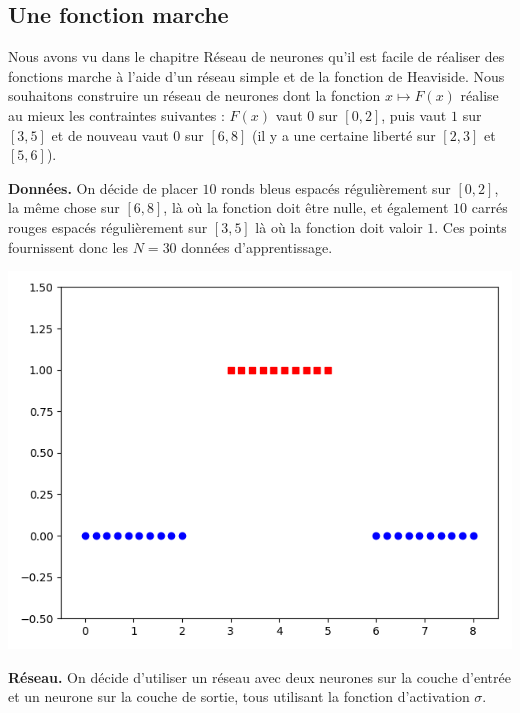 \subsection{Une fonction marche}

Nous avons vu dans le chapitre  \og{}Réseau de neurones\fg{} qu'il est facile de réaliser des fonctions \og{}marche\fg{} à l'aide d'un réseau simple et de la fonction de Heaviside.
Nous souhaitons construire un réseau de neurones dont la fonction $x \mapsto F(x)$ réalise au mieux les contraintes suivantes : $F(x)$ vaut $0$ sur $[0,2]$, puis vaut $1$ sur $[3,5]$ et de nouveau vaut
$0$ sur $[6,8]$ (il y a une certaine liberté sur $[2,3]$ et $[5,6]$).


\bigskip

\textbf{Données.}
On décide de placer $10$ ronds bleus espacés régulièrement sur $[0,2]$, la même chose sur 
$[6,8]$, là où la fonction doit être nulle, et également $10$ carrés rouges espacés régulièrement sur $[3,5]$ là où la fonction doit valoir $1$. Ces points fournissent donc les $N=30$ données d'apprentissage. 

\begin{center}
	\includegraphics[scale=\myscale,scale=0.4]{figures/retro_03_a}
\end{center}

\bigskip

\textbf{Réseau.}
On décide d'utiliser un réseau avec deux neurones sur la couche d'entrée et un neurone sur la couche de sortie, tous utilisant la fonction d'activation $\sigma$.

